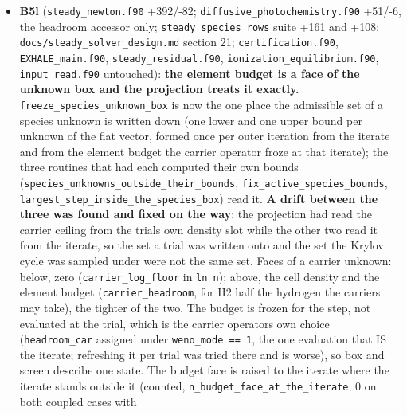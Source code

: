 \documentclass[english,a4paper]{my_memo}
\begin{document}
\begin{itemize}
  3/0, \texttt{certification} 29/0, \texttt{physics\_probe} 1491/0; the two documents that
  named the old \texttt{=1} spelling annotated. Recorded: \texttt{gm\_m\ =\ 40} is a literal
  at the call site in \texttt{EXHALE\_main.f90} and the log-unknown solve sits at it in 58 of
  66 iterations (unmeasured whether raising it helps, the cycle reports
  iterations used, not the residual reached); \texttt{carrier\_headroom} returns
  \texttt{huge} as an availability sentinel. \textbf{Next item B5l}: the element budget
  as a face of the unknown box.
\item
  \textbf{B5l} (\texttt{steady\_newton.f90} +392/-82; \texttt{diffusive\_photochemistry.f90}
  +51/-6, the headroom accessor only; \texttt{steady\_species\_rows} suite +161 and
  +108; \texttt{docs/steady\_solver\_design.md} section 21; \texttt{certification.f90},
  \texttt{EXHALE\_main.f90}, \texttt{steady\_residual.f90}, \texttt{ionization\_equilibrium.f90},
  \texttt{input\_read.f90} untouched): \textbf{the element budget is a face of the unknown
  box and the projection treats it exactly.} \texttt{freeze\_species\_unknown\_box}
  is now the one place the admissible set of a species unknown is written
  down (one lower and one upper bound per unknown of the flat vector,
  formed once per outer iteration from the iterate and from the element
  budget the carrier operator froze at that iterate); the three routines
  that had each computed their own bounds
  (\texttt{species\_unknowns\_outside\_their\_bounds}, \texttt{fix\_active\_species\_bounds},
  \texttt{largest\_step\_inside\_the\_species\_box}) read it. \textbf{A drift between the
  three was found and fixed on the way}: the projection had read the
  carrier ceiling from the trial\textquotesingle s own density slot while the other two
  read it from the iterate, so the set a trial was written onto and the set
  the Krylov cycle was sampled under were not the same set. Faces of a
  carrier unknown: below, zero (\texttt{carrier\_log\_floor} in \texttt{ln\ n}); above, the
  cell density and the element budget (\texttt{carrier\_headroom}, for H2 half the
  hydrogen the carriers may take), the tighter of the two. The budget is
  frozen for the step, not evaluated at the trial, which is the carrier
  operator\textquotesingle s own choice (\texttt{headroom\_car} assigned under \texttt{weno\_mode\ ==\ 1},
  the one evaluation that IS the iterate; refreshing it per trial was tried
  there and is worse), so box and screen describe one state. The budget
  face is raised to the iterate where the iterate stands outside it
  (counted, \texttt{n\_budget\_face\_at\_the\_iterate}; 0 on both coupled cases with

\end{itemize}
\end{document}
